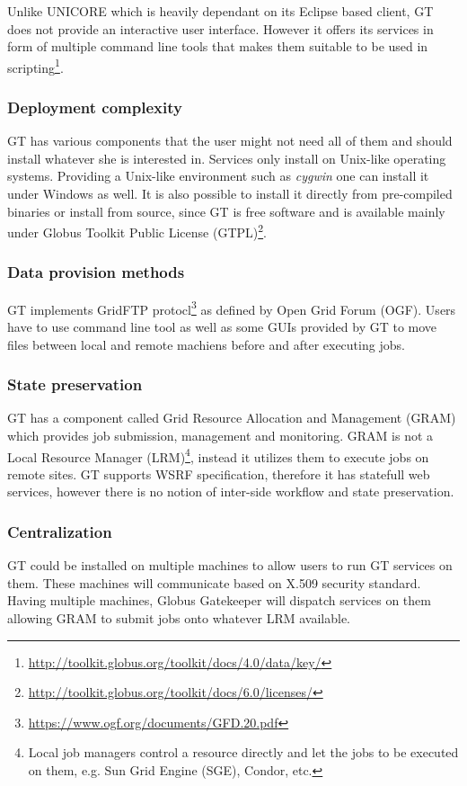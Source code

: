 Unlike UNICORE which is heavily dependant on its Eclipse based client, 
GT does not provide an interactive user interface. However it offers its services in form of multiple command 
line tools that makes them suitable to be used in 
scripting\footnote{\url{http://toolkit.globus.org/toolkit/docs/4.0/data/key/}}.

\subsubsection {Deployment complexity}
GT has various components that the user might not need all of them and should install whatever she is
interested in. Services only install on Unix-like operating systems. Providing a Unix-like environment
such as \textit{cygwin} one can install it under Windows as well. It is also possible to install it directly
from pre-compiled binaries or install from source, since GT is free software and is available mainly
under Globus Toolkit Public License (GTPL)\footnote{\url{http://toolkit.globus.org/toolkit/docs/6.0/licenses/}}.

\subsubsection{Data provision methods}
GT implements GridFTP protocl\footnote{\url{https://www.ogf.org/documents/GFD.20.pdf}} as defined by Open Grid Forum (OGF).
Users have to use command line tool as well as some GUIs provided by GT to move files between local and remote 
machiens before and after executing jobs.
\subsubsection {State preservation}
GT has a component called Grid Resource Allocation and Management (GRAM) which provides job submission, management
and monitoring. GRAM is not a Local Resource Manager (LRM)\footnote{Local job managers control a resource
directly and let the jobs to be executed on them, e.g. Sun Grid Engine (SGE), Condor, etc.}, instead it utilizes
them to execute jobs on remote sites. 
GT supports WSRF specification, therefore it has statefull web services, however there is no notion of inter-side workflow
and state preservation.
\subsubsection {Centralization}
GT could be installed on multiple machines to allow users to run GT services on them. These machines will communicate
based on X.509 security standard. Having multiple machines, Globus Gatekeeper will dispatch services on them allowing
GRAM to submit jobs onto whatever LRM available.
